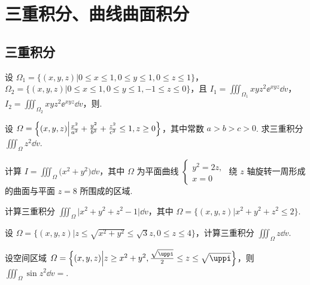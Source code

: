 \section{三重积分、曲线曲面积分}
	\subsection{三重积分}

	\begin{ti}
		设 $\varOmega_{1} = \bigl\{ (x,y,z) \bigl| 0 \leq x \leq 1, 0 \leq y \leq 1, 0 \leq z \leq 1 \bigr\}$，$\varOmega_{2} = \bigl\{ (x,y,z) \bigl| 0 \leq x \leq 1, 0 \leq y \leq 1, -1 \leq z \leq 0 \bigr\}$，且 $I_{1} = \iiint_{\varOmega_{1}} x y z^{2} \ee^{xyz} \dd{v}$，$I_{2} = \iiint_{\varOmega_{2}} x y z^{2} \ee^{xyz} \dd{v}$，则\kuo.

	\end{ti}

	\begin{ti}
		设 $\varOmega = \Bigl\{ (x,y,z) \Bigl| \frac{x^{2}}{a^{2}} + \frac{y^{2}}{b^{2}} + \frac{z^{2}}{c^{2}} \leq 1, z \geq 0 \Bigr\}$，其中常数 $a > b > c > 0$. 求三重积分 $\iiint_{\varOmega} z^{2} \dd{v}$.
	\end{ti}

	\begin{ti}
		计算 $I = \iiint_{\varOmega} \bigl( x^{2} + y^{2} \bigr) \dd{v}$，其中 $\varOmega$ 为平面曲线 $\begin{cases}
			y^{2} = 2z,\\
			x = 0
		\end{cases}$ 绕 $z$ 轴旋转一周形成的曲面与平面 $z = 8$ 所围成的区域.
	\end{ti}

	\begin{ti}
		计算三重积分 $\iiint_{\varOmega} \bigl| x^{2} + y^{2} + z^{2} - 1 \bigr| \dd{v}$，其中 $\varOmega = \bigl\{ (x,y,z) \bigl| x^{2} + y^{2} + z^{2} \leq 2 \bigr\}$.
	\end{ti}

	\begin{ti}
		设 $\varOmega = \bigl\{ (x,y,z) \bigl| z \leq \sqrt{x^{2} + y^{2}} \leq \sqrt{3}z, 0 \leq z \leq 4 \bigr\}$，计算三重积分 $\iiint_{\varOmega} z \dd{v}$.
	\end{ti}

	\begin{ti}
		设空间区域 $\varOmega = \Bigl\{ (x,y,z) \Bigl| z \geq x^{2} + y^{2}, \frac{\sqrt{\uppi}}{2} \leq z \leq \sqrt{\uppi} \Bigr\}$，则 $\iiint_{\varOmega} \sin z^{2} \dd{v} = $\htwo.
	\end{ti}

